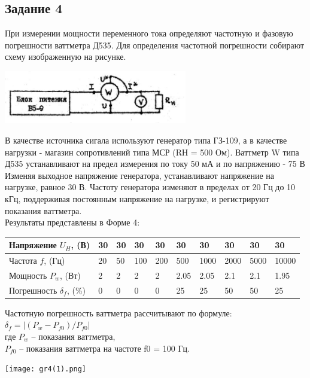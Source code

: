 \newpage

\subsection*{Задание 4}

	При измерении мощности переменного тока определяют частотную и фазовую погрешности 			ваттметра Д535. Для определения частотной погрешности собирают схему изображенную на 	рисунке. \\
	
	\begin{center}
		\includegraphics[width=0.6\textwidth]{ch4.png}\\
	\end{center}
 	
 	В качестве источника сигала используют генератор типа ГЗ-109, а в качестве нагрузки 		- магазин сопротивлений типа МСР (RН = 500 Ом). Ваттметр W типа Д535 устанавливают 			на предел измерения по току 50 мА и по напряжению - 75 В Изменяя выходное напряжение 	генератора, устанавливают напряжение на нагрузке, равное 30 В. Частоту генератора			изменяют в пределах от 20 Гц до 10 кГц, поддерживая постоянным напряжение на 				нагрузке, и регистрируют показания ваттметра.  \\
 	Результаты представлены в Форме 4:\\
 	
 	
 	\begin{table} [h!]
 	 \begin{tabular}{|p{4cm}|p{1cm}|p{1cm}|p{1cm}|p{1cm}|p{1cm}|p{1.2cm}|						p{1.2cm}|p{1.2cm}|p{1.2cm}|}
 	\hline
 	Напряжение $U_{H}$, (В) & 30 & 30 & 30 & 30 & 30 & 30 & 30 & 30 & 30 \\
 	\hline
 	Частота $f$, (Гц) & 20 & 50 & 100 & 200 & 500 & 1000 & 2000 & 5000 & 10000 \\
 	\hline
 	Мощность $P_{w}$, (Вт) & 2 & 2 & 2 & 2 & 2.05 & 2.05 & 2.1 & 2.1 & 1.95 \\
 	\hline
 	Погрешность $\delta _{f}$, (\%) & 0 & 0 & 0 & 0 & 25 & 25 & 50 & 50 & 25 \\
 	\hline
 	\end{tabular}
 	\end{table}
 	
 	\vspace{0.5cm}
 	Частотную погрешность ваттметра рассчитывают по формуле:\\
 	$ \delta _{f} = |(P_{w} - P_{f0}) / P_{f0}| $ \\
 	где $P_{w}$ – показания ваттметра,\\
 	$P_{f0}$ – показания ваттметра на частоте f0 = 100 Гц.\\
 	
 	\begin{center}
 	 	\texttt{[image: gr4(1).png]}\\
 	\end{center}
 	
 	
 	
  
  